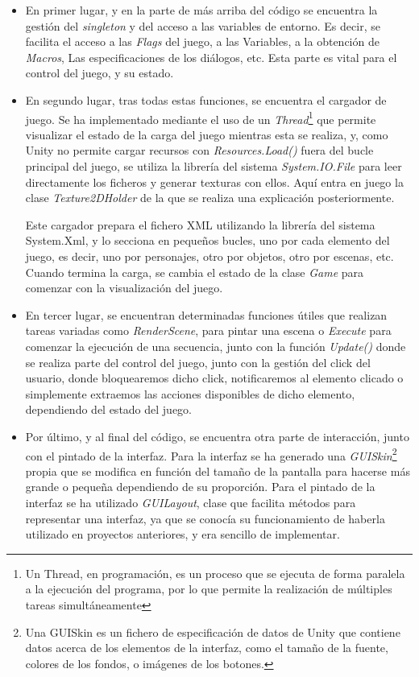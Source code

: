 \begin{itemize}
	
	\item En primer lugar, y en la parte de más arriba del código se encuentra la gestión del \textit{singleton} y del acceso a las variables de entorno. Es decir, se facilita el acceso a las \textit{Flags} del juego, a las Variables, a la obtención de \textit{Macros}, Las especificaciones de los diálogos, etc. Esta parte es vital para el control del juego, y su estado.
	
	\item En segundo lugar, tras todas estas funciones, se encuentra el cargador de juego. Se ha implementado mediante el uso de un \textit{Thread}\footnote{Un Thread, en programación, es un proceso que se ejecuta de forma paralela a la ejecución del programa, por lo que permite la realización de múltiples tareas simultáneamente} que permite visualizar el estado de la carga del juego mientras esta se realiza, y, como Unity no permite cargar recursos con \textit{Resources.Load()} fuera del bucle principal del juego, se utiliza la librería del sistema \textit{System.IO.File} para leer directamente los ficheros y generar texturas con ellos. Aquí entra en juego la clase \textit{Texture2DHolder} de la que se realiza una explicación posteriormente.
	
	Este cargador prepara el fichero XML utilizando la librería del sistema System.Xml, y lo secciona en pequeños bucles, uno por cada elemento del juego, es decir, uno por personajes, otro por objetos, otro por escenas, etc. Cuando termina la carga, se cambia el estado de la clase \textit{Game} para comenzar con la visualización del juego.
	
	\item En tercer lugar, se encuentran determinadas funciones útiles que realizan tareas variadas como \textit{RenderScene}, para pintar una escena o \textit{Execute} para comenzar la ejecución de una secuencia, junto con la función \textit{Update()} donde se realiza parte del control del juego, junto con la gestión del click del usuario, donde bloquearemos dicho click, notificaremos al elemento clicado o simplemente extraemos las acciones disponibles de dicho elemento, dependiendo del estado del juego.
	
	\item Por último, y al final del código, se encuentra otra parte de interacción, junto con el pintado de la interfaz. Para la interfaz se ha generado una \textit{GUISkin}\footnote{Una GUISkin es un fichero de especificación de datos de Unity que contiene datos acerca de los elementos de la interfaz, como el tamaño de la fuente, colores de los fondos, o imágenes de los botones.} propia que se modifica en función del tamaño de la pantalla para hacerse más grande o pequeña dependiendo de su proporción. Para el pintado de la interfaz se ha utilizado \textit{GUILayout}, clase que facilita métodos para representar una interfaz, ya que se conocía su funcionamiento de haberla utilizado en proyectos anteriores, y era sencillo de implementar.
	

\end{itemize}
